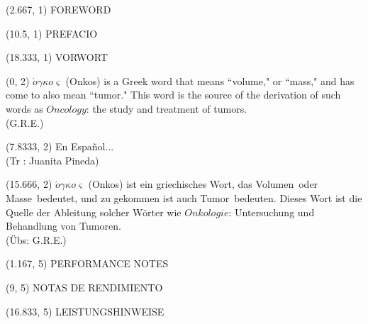 \documentclass[10pt]{article}
\begin{document}
\begin{textblock}{23}(2.667, 1)
\huge FOREWORD
\end{textblock}

\begin{textblock}{23}(10.5, 1)
\huge PREFACIO
\end{textblock}

\begin{textblock}{23}(18.333, 1)
\huge VORWORT
\end{textblock}

\begin{textblock}{7.333}(0, 2)
$\acute{o} \gamma \kappa o \varsigma$ (Onkos) is a Greek word that means ``volume," or ``mass," and has come to also mean ``tumor." This word is the source of the derivation of such words as $Oncology$: the study and treatment of tumors.  \\
\phantom{text} \hfill (G.R.E.)
  \end{textblock}





\begin{textblock}{7.333}(7.8333, 2) 
En Espa\~nol... \\
\phantom{text}  \hfill (Tr : Juanita Pineda)
 \end{textblock}





\begin{textblock}{7.333}(15.666, 2) 
$\acute{o} \gamma \kappa o \varsigma$ (Onkos) ist ein griechisches Wort, das \guillemotleft Volumen\guillemotright \ oder \guillemotleft Masse\guillemotright \ bedeutet, und zu gekommen ist auch \guillemotleft Tumor\guillemotright \ bedeuten. Dieses Wort ist die Quelle der Ableitung solcher W\"orter wie $Onkologie$: Untersuchung und Behandlung von Tumoren. \\
\phantom{text} \hfill (Übs: G.R.E.)
 \end{textblock}

\begin{textblock}{23}(1.167, 5)
\huge PERFORMANCE NOTES
\end{textblock}

\begin{textblock}{23}(9, 5)
\huge NOTAS DE RENDIMIENTO
\end{textblock}

\begin{textblock}{23}(16.833, 5)
\huge LEISTUNGSHINWEISE
\end{textblock}
\end{document}
